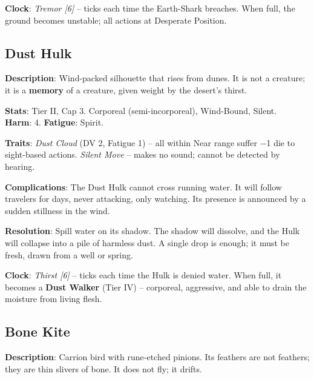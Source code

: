 \noindent\textbf{Clock}: \emph{Tremor [6]} -- ticks each time the Earth-Shark breaches. When full, the ground becomes unstable; all actions at Desperate Position.


\subsection*{Dust Hulk}

\noindent\textbf{Description}: Wind-packed silhouette that rises from dunes. It is not a creature; it is a \textbf{memory} of a creature, given weight by the desert's thirst.

\noindent\textbf{Stats}: Tier II, Cap 3. Corporeal (semi-incorporeal), Wind-Bound, Silent.\\
\textbf{Harm}: 4. \textbf{Fatigue}: Spirit.

\noindent\textbf{Traits}: 
\emph{Dust Cloud} (DV 2, Fatigue 1) -- all within Near range suffer −1 die to sight-based actions. \emph{Silent Move} -- makes no sound; cannot be detected by hearing.

\noindent\textbf{Complications}: The Dust Hulk cannot cross running water. It will follow travelers for days, never attacking, only watching. Its presence is announced by a sudden stillness in the wind.

\noindent\textbf{Resolution}: Spill water on its shadow. The shadow will dissolve, and the Hulk will collapse into a pile of harmless dust. A single drop is enough; it must be fresh, drawn from a well or spring.

\noindent\textbf{Clock}: \emph{Thirst [6]} -- ticks each time the Hulk is denied water. When full, it becomes a \textbf{Dust Walker} (Tier IV) -- corporeal, aggressive, and able to drain the moisture from living flesh.


\subsection*{Bone Kite}

\noindent\textbf{Description}: Carrion bird with rune-etched pinions. Its feathers are not feathers; they are thin slivers of bone. It does not fly; it drifts.

